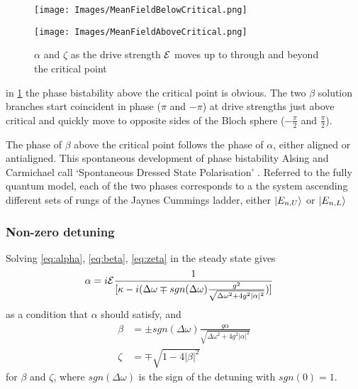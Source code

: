 \begin{figure}[h]
  \begin{minipage}{.5\linewidth}
    \centering
    \texttt{[image: Images/MeanFieldBelowCritical.png]}
    \label{fig:zeta}
  \end{minipage}%
  \begin{minipage}{.5\linewidth}
    \centering
    \texttt{[image: Images/MeanFieldAboveCritical.png]}
    \label{fig:alpha}
  \end{minipage}
  \caption{$\alpha$ and $\zeta$ as the drive strength $\mathcal{E}$ moves up to through and beyond the critical point}
\end{figure}

in \cref{fig:alpha} the phase bistability above the critical point is obvious. The two $\beta$ solution branches start coincident in phase ($\pi$ and $-\pi$) at drive strengths just above critical and quickly move to opposite sides of the Bloch sphere ($-\frac{\pi}{2}$ and $\frac{\pi}{2}$).

The phase of $\beta$ above the critical point follows the phase of $\alpha$, either aligned or antialigned. This spontaneous development of phase bistability Alsing and Carmichael call `Spontaneous Dressed State Polarisation' \autocite{Alsing1990}. Referred to the fully quantum model, each of the two phases corresponds to a the system ascending different sets of rungs of the Jaynes Cummings ladder, either $| E_{n, U} \rangle$ or $| E_{n, L} \rangle$
\subsubsection{Non-zero detuning}
Solving \cref{eq:alpha}, \cref{eq:beta}, \cref{eq:zeta} in the steady state gives
\begin{align}
  \alpha& = i \mathcal{E}\frac{1}{[\kappa-i(\Delta \omega \mp sgn(\Delta \omega) \frac{g^2}{\sqrt{\Delta \omega^2 +4g^2 |\alpha|^2}})]}
\end{align}
as a condition that $\alpha$ should satisfy, and
\begin{align}
  \beta& = \pm sgn(\Delta \omega) \frac{g \alpha}{\sqrt{\Delta \omega^2 + 4 g^2 |\alpha|^2}}\\
  \zeta& = \mp \sqrt{1-4|\beta|^2}
\end{align}
for $\beta$ and $\zeta$, where $sgn(\Delta \omega)$ is the sign of the detuning with $sgn(0) = 1$.

